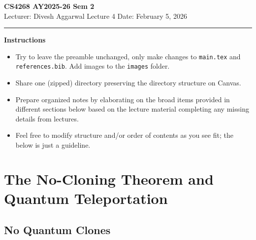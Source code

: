 



% 


\newpage
\noindent
\textbf{CS4268 AY2025-26 Sem 2}
\\
\noindent
Lecturer: Divesh Aggarwal
\hfill
Lecture 4                      %
\hfill
Date: February 5, 2026          %


\noindent
\rule{\textwidth}{1pt}

\medskip


\textbf{Instructions}\\
\begin{itemize}
    \item Try to leave the preamble unchanged, only make changes to \texttt{main.tex} and  \texttt{references.bib}. Add images to the \texttt{images} folder. 
    \item Share one (zipped) directory preserving the directory structure on Canvas. 
    \item Prepare organized notes by elaborating on the broad items provided in different sections below based on the lecture material completing any missing details from lectures.
    \item Feel free to modify structure and/or order of contents as you see fit; the below is just a guideline.
\end{itemize} 

\section{The No-Cloning Theorem and Quantum Teleportation}

\subsection{No Quantum Clones}


